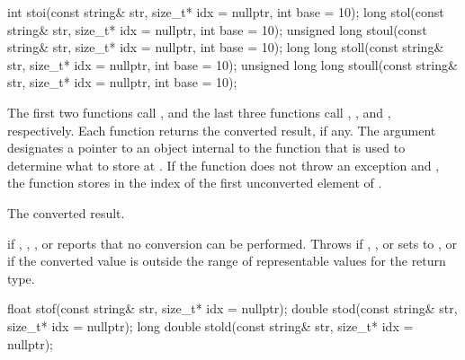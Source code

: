 %
%
%
%
%
\begin{itemdecl}
int stoi(const string& str, size_t* idx = nullptr, int base = 10);
long stol(const string& str, size_t* idx = nullptr, int base = 10);
unsigned long stoul(const string& str, size_t* idx = nullptr, int base = 10);
long long stoll(const string& str, size_t* idx = nullptr, int base = 10);
unsigned long long stoull(const string& str, size_t* idx = nullptr, int base = 10);
\end{itemdecl}

\begin{itemdescr}
\pnum
\effects
The first two functions call ,
and the last three functions call ,
, and , respectively. Each function returns the converted result, if any. The
argument  designates a pointer to an object internal to the function
that is used to determine what to store at . If the function does
not throw an exception and , the function stores in 
the index of the first unconverted element of .

\pnum
\returns
The converted result.

\pnum
\throws
{} if , ,
, or  reports that no conversion can be
performed. Throws  if , ,
 or  sets  to ,
or if the converted value is outside the range of representable values
for the return type.
\end{itemdescr}

%
%
%
\begin{itemdecl}
float stof(const string& str, size_t* idx = nullptr);
double stod(const string& str, size_t* idx = nullptr);
long double stold(const string& str, size_t* idx = nullptr);
\end{itemdecl}

